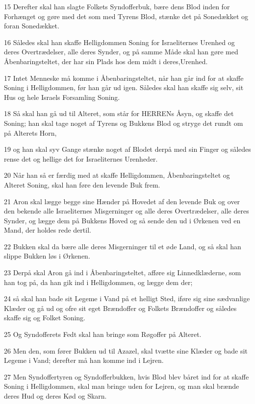 \par 15 Derefter skal han slagte Folkets Syndofferbuk, bære dens Blod inden for Forhænget og gøre med det som med Tyrens Blod, stænke det på Sonedækket og foran Sonedækket.
\par 16 Således skal han skaffe Helligdommen Soning for Israeliternes Urenhed og deres Overtrædelser, alle deres Synder, og på samme Måde skal han gøre med Åbenbaringsteltet, der har sin Plads hos dem midt i deres,Urenhed.
\par 17 Intet Menneske må komme i Åbenbaringsteltet, når han går ind for at skaffe Soning i Helligdommen, før han går ud igen. Således skal han skaffe sig selv, sit Hus og hele Israels Forsamling Soning.
\par 18 Så skal han gå ud til Alteret, som står for HERRENs Åsyn, og skaffe det Soning; han skal tage noget af Tyrens og Bukkens Blod og stryge det rundt om på Alterets Horn,
\par 19 og han skal syv Gange stænke noget af Blodet derpå med sin Finger og således rense det og hellige det for Israeliternes Urenheder.
\par 20 Når han så er færdig med at skaffe Helligdommen, Åbenbaringsteltet og Alteret Soning, skal han føre den levende Buk frem.
\par 21 Aron skal lægge begge sine Hænder på Hovedet af den levende Buk og over den bekende alle Israeliternes Misgerninger og alle deres Overtrædelser, alle deres Synder, og lægge dem på Bukkens Hoved og så sende den ud i Ørkenen ved en Mand, der holdes rede dertil.
\par 22 Bukken skal da bære alle deres Misgerninger til et øde Land, og så skal han slippe Bukken løs i Ørkenen.
\par 23 Derpå skal Aron gå ind i Åbenbaringsteltet, afføre sig Linnedklæderne, som han tog på, da han gik ind i Helligdommen, og lægge dem der;
\par 24 så skal han bade sit Legeme i Vand på et helligt Sted, iføre sig sine sædvanlige Klæder og gå ud og ofre sit eget Brændoffer og Folkets Brændoffer og således skaffe sig og Folket Soning.
\par 25 Og Syndofferets Fedt skal han bringe som Røgoffer på Alteret.
\par 26 Men den, som fører Bukken ud til Azazel, skal tvætte sine Klæder og bade sit Legeme i Vand; derefter må han komme ind i Lejren.
\par 27 Men Syndoffertyren og Syndofferbukken, hvis Blod blev båret ind for at skaffe Soning i Helligdommen, skal man bringe uden for Lejren, og man skal brænde deres Hud og deres Kød og Skarn.
